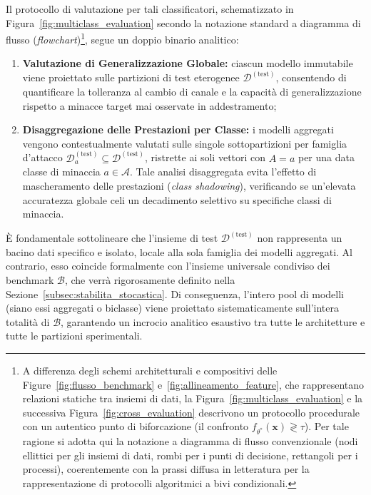 Il protocollo di valutazione per tali classificatori, schematizzato in Figura~\ref{fig:multiclass_evaluation} secondo la notazione standard a diagramma di flusso (\textit{flowchart})\footnote{A differenza degli schemi architetturali e compositivi delle Figure~\ref{fig:flusso_benchmark} e~\ref{fig:allineamento_feature}, che rappresentano relazioni statiche tra insiemi di dati, la Figura~\ref{fig:multiclass_evaluation} e la successiva Figura~\ref{fig:cross_evaluation} descrivono un protocollo procedurale con un autentico punto di biforcazione (il confronto $f_{\theta^*}(\mathbf{x}) \gtrless \tau$). Per tale ragione si adotta qui la notazione a diagramma di flusso convenzionale (nodi ellittici per gli insiemi di dati, rombi per i punti di decisione, rettangoli per i processi), coerentemente con la prassi diffusa in letteratura per la rappresentazione di protocolli algoritmici a bivi condizionali.}, segue un doppio binario analitico:
\begin{enumerate}
    \item \textbf{Valutazione di Generalizzazione Globale:} ciascun modello immutabile viene proiettato sulle partizioni di test eterogenee $\mathcal{D}^{(\text{test})}$, consentendo di quantificare la tolleranza al cambio di canale e la capacità di generalizzazione rispetto a minacce target mai osservate in addestramento;
    \item \textbf{Disaggregazione delle Prestazioni per Classe:} i modelli aggregati vengono contestualmente valutati sulle singole sottopartizioni per famiglia d'attacco $\mathcal{D}_a^{(\text{test})} \subseteq \mathcal{D}^{(\text{test})}$, ristrette ai soli vettori con $A=a$ per una data classe di minaccia $a \in \mathcal{A}$. Tale analisi disaggregata evita l'effetto di mascheramento delle prestazioni (\textit{class shadowing}), verificando se un'elevata accuratezza globale celi un decadimento selettivo su specifiche classi di minaccia.
\end{enumerate}

È fondamentale sottolineare che l'insieme di test $\mathcal{D}^{(\text{test})}$ non rappresenta un bacino dati specifico e isolato, locale alla sola famiglia dei modelli aggregati. Al contrario, esso coincide formalmente con l'insieme universale condiviso dei benchmark $\mathcal{B}$, che verrà rigorosamente definito nella Sezione~\ref{subsec:stabilita_stocastica}. Di conseguenza, l'intero pool di modelli (siano essi aggregati o biclasse) viene proiettato sistematicamente sull'intera totalità di $\mathcal{B}$, garantendo un incrocio analitico esaustivo tra tutte le architetture e tutte le partizioni sperimentali.

